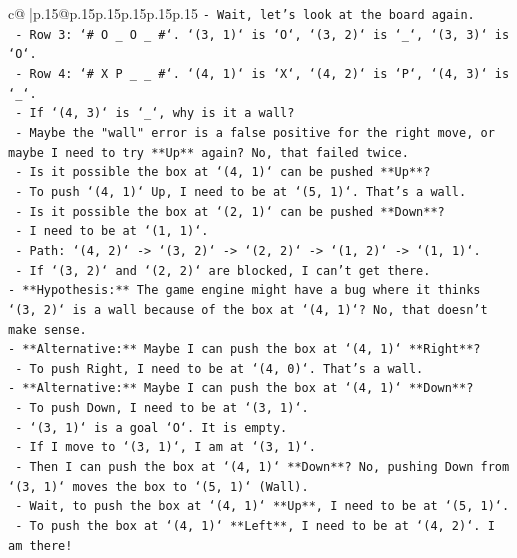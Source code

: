 \documentclass{article}
\begin{document}
{\begin{supertabular}{c@{$\;$}|p{.15\linewidth}@{}p{.15\linewidth}p{.15\linewidth}p{.15\linewidth}p{.15\linewidth}p{.15\linewidth}}
{{{\texttt{{-} Wait, let's look at the board again.} \\
\texttt{    {-} Row 3: `\# O \_ O \_ \#`. `(3, 1)` is `O`, `(3, 2)` is `\_`, `(3, 3)` is `O`.} \\
\texttt{    {-} Row 4: `\# X P \_ \_ \#`. `(4, 1)` is `X`, `(4, 2)` is `P`, `(4, 3)` is `\_`.} \\
\texttt{    {-} If `(4, 3)` is `\_`, why is it a wall?} \\
\texttt{    {-} Maybe the "wall" error is a false positive for the right move, or maybe I need to try **Up** again? No, that failed twice.} \\
\texttt{    {-} Is it possible the box at `(4, 1)` can be pushed **Up**?} \\
\texttt{        {-} To push `(4, 1)` Up, I need to be at `(5, 1)`. That's a wall.} \\
\texttt{    {-} Is it possible the box at `(2, 1)` can be pushed **Down**?} \\
\texttt{        {-} I need to be at `(1, 1)`.} \\
\texttt{        {-} Path: `(4, 2)` {-}> `(3, 2)` {-}> `(2, 2)` {-}> `(1, 2)` {-}> `(1, 1)`.} \\
\texttt{        {-} If `(3, 2)` and `(2, 2)` are blocked, I can't get there.} \\
\texttt{{-} **Hypothesis:** The game engine might have a bug where it thinks `(3, 2)` is a wall because of the box at `(4, 1)`? No, that doesn't make sense.} \\
\texttt{{-} **Alternative:** Maybe I can push the box at `(4, 1)` **Right**?} \\
\texttt{    {-} To push Right, I need to be at `(4, 0)`. That's a wall.} \\
\texttt{{-} **Alternative:** Maybe I can push the box at `(4, 1)` **Down**?} \\
\texttt{    {-} To push Down, I need to be at `(3, 1)`.} \\
\texttt{    {-} `(3, 1)` is a goal `O`. It is empty.} \\
\texttt{    {-} If I move to `(3, 1)`, I am at `(3, 1)`.} \\
\texttt{    {-} Then I can push the box at `(4, 1)` **Down**? No, pushing Down from `(3, 1)` moves the box to `(5, 1)` (Wall).} \\
\texttt{    {-} Wait, to push the box at `(4, 1)` **Up**, I need to be at `(5, 1)`.} \\
\texttt{    {-} To push the box at `(4, 1)` **Left**, I need to be at `(4, 2)`. I am there!} \\
}}}
\end{supertabular}}
\end{document}
